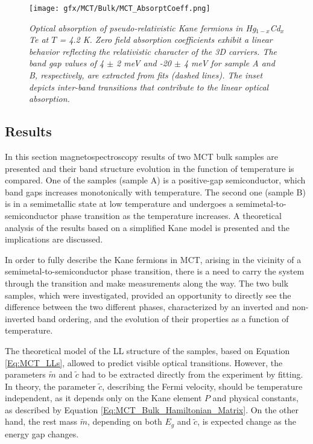 \documentclass[titlepage,a4paper]{book}
\newcommand{\wciecie}{\quad\phantom{v}}
\begin{document}
\begin{figure}[H]
	\centering
	\texttt{[image: gfx/MCT/Bulk/MCT\_AbsorptCoeff.png]}
	\vspace{-10pt}
	\caption{\textit{Optical absorption of pseudo-relativistic Kane fermions in Hg$_{1-x}$Cd$_x$Te at $T$ = 4.2 K. Zero field absorption coefficients exhibit a linear behavior reflecting the relativistic character of the 3D carriers. The band gap values of 4 $\pm$ 2 meV and -20 $\pm$ 4 meV for sample A and B, respectively, are extracted from fits (dashed lines). The inset depicts inter-band transitions that contribute to the linear optical absorption.}}	
\label{fig:Samples_MCT_AbsorptCoeff}
\end{figure} 

\subsection{Results}
\label{sec:MCT_bulk}
\wciecie
In this section magnetospectroscopy results of two MCT bulk samples are presented and their band structure evolution in the function of temperature is compared. One of the samples (sample A) is a positive-gap semiconductor, which band gaps increases monotonically with temperature. The second one (sample B) is in a semimetallic state at low temperature and undergoes a semimetal-to-semiconductor phase transition as the temperature increases. A theoretical analysis of the results based on a simplified Kane model is presented and the implications are discussed.

In order to fully describe the Kane fermions in MCT, arising in the vicinity of a semimetal-to-semiconductor phase transition, there is a need to carry the system through the transition and make measurements along the way. The two bulk samples, which were investigated, provided an opportunity to directly see the difference between the two different phases, characterized by an inverted and non-inverted band ordering, and the evolution of their properties as a function of temperature.  

The theoretical model of the LL structure of the samples, based on Equation \ref{Eq:MCT_LLs}, allowed to predict visible optical transitions. However, the parameters $\tilde{m}$ and $\tilde c$ had to be extracted directly from the experiment by fitting. In theory, the parameter $\tilde c$, describing the Fermi velocity, should be temperature independent, as it depends only on the Kane element $P$ and physical constants, as described by Equation \ref{Eq:MCT_Bulk_Hamiltonian_Matrix}. On the other hand, the rest mass $\tilde{m}$, depending on both $E_g$ and $\tilde{c}$, is expected change as the energy gap changes.
\end{document}
